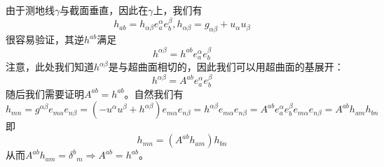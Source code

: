 \documentclass[hyperref, UTF8, a4paper]{ctexart}
\begin{document}
由于测地线$\gamma $与截面垂直，因此在$\gamma $上，我们有
\begin{equation*}
	h_{ab} =h_{\alpha \beta } e_{a}^{\alpha } e_{b}^{\beta } ,h_{\alpha \beta } =g_{\alpha \beta } +u_{\alpha } u_{\beta }
\end{equation*}
很容易验证，其逆$h^{ab}$满足
\begin{equation*}
	h^{\alpha \beta } =h^{ab} e_{a}^{\alpha } e_{b}^{\beta }
\end{equation*}
注意，此处我们知道$h^{\alpha \beta }$是与超曲面相切的，因此我们可以用超曲面的基展开：
\begin{equation*}
	h^{\alpha \beta } =A^{ab} e_{a}^{\alpha } e_{b}^{\beta }
\end{equation*}
随后我们需要证明$A^{ab} =h^{ab}$。自然我们有
\begin{equation*}
	h_{mn} =g^{\alpha \beta } e_{m\alpha } e_{n\beta } =\left( -u^{\alpha } u^{\beta } +h^{\alpha \beta }\right) e_{m\alpha } e_{n\beta } =h^{\alpha \beta } e_{m\alpha } e_{n\beta } =A^{ab} e_{a}^{\alpha } e_{b}^{\beta } e_{m\alpha } e_{n\beta } =A^{ab} h_{am} h_{bn}
\end{equation*}
即
\begin{equation*}
	h_{mn} =\left( A^{ab} h_{am}\right) h_{bn}
\end{equation*}
从而$A^{ab} h_{am} =\delta ^{b}{}_{m} \Rightarrow A^{ab} =h^{ab}$。
\end{document}
